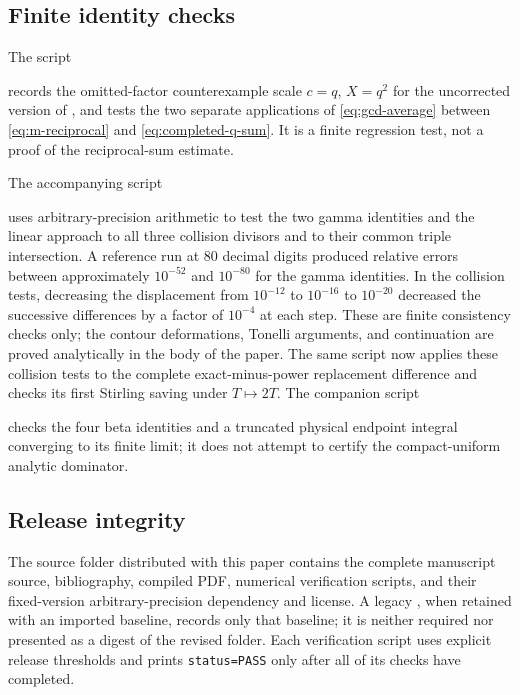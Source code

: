 \subsection{Finite identity checks}

The script
\begin{center}
\end{center}
records the omitted-factor counterexample scale $c=q$, $X=q^2$ for the uncorrected version of
, and tests the two separate applications of
\eqref{eq:gcd-average} between \eqref{eq:m-reciprocal} and
\eqref{eq:completed-q-sum}.  It is a finite regression test, not a proof of
the reciprocal-sum estimate.

The accompanying script
\begin{center}
\end{center}
uses arbitrary-precision arithmetic to test the two gamma identities and the
linear approach to all three collision divisors and to their common triple
intersection.  A reference run at 80 decimal
digits produced relative errors between approximately $10^{-52}$ and
$10^{-80}$ for the gamma identities.  In the collision tests, decreasing the
displacement from $10^{-12}$ to $10^{-16}$ to $10^{-20}$ decreased the
successive differences by a factor of $10^{-4}$ at each step.  These are
finite consistency checks only; the contour deformations, Tonelli arguments,
and continuation are proved analytically in the body of the paper.
The same script now applies these collision tests to the complete
exact-minus-power replacement difference and checks its first Stirling saving under
$T\mapsto2T$.  The companion script
\begin{center}
\end{center}
checks the four beta identities
and a truncated physical endpoint integral converging to its finite limit; it
does not attempt to certify the compact-uniform analytic dominator.

\subsection{Release integrity}

The source folder distributed with this paper contains the complete manuscript
source, bibliography, compiled PDF, numerical verification scripts, and their
fixed-version arbitrary-precision dependency and license.  A legacy
, when retained with an imported baseline, records only
that baseline; it is neither required nor presented as a digest of the revised
folder.  Each verification script uses explicit release thresholds and prints
\texttt{status=PASS} only after all of its checks have completed.
